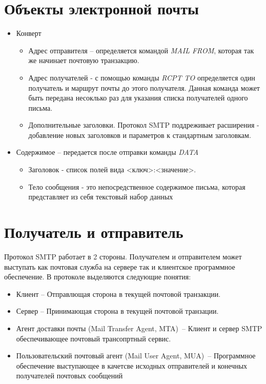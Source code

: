 \documentclass[a4paper,12pt]{report}
\begin{document}
	 \section{Объекты электронной почты} 
	 \begin{itemize}
	 	\item Конверт
	 	   \begin{itemize}
	 	       \item Адрес отправителя -- определяется командой \textit{MAIL FROM}, которая так же начинает почтовую транзакцию. 
	 	       \item Адрес получателей - с помощью команды \textit{RCPT TO} определяется один получатель и маршрут почты до этого получателя. Данная команда может быть передана несоклько раз для указания списка получателей одного письма.
	 	       \item Дополнительные заголовки. Протокол SMTP поддреживает расширения - добавление новых заголовков и параметров к стандартным заголовкам.
	 	   \end{itemize}
	 	  \item Содержимое -- передается после отправки команды \textit{DATA}
	 	  \begin{itemize}
	 	      \item Заголовок - список полей вида <ключ>:<значение>.
	 	      \item Тело сообщения - это непосредственное содержимое письма, которая представляет из себя текстовый набор данных
		   \end{itemize}
	 \end{itemize}
	 
	 \section{Получатель и отправитель}
	 
	 Протокол SMTP работает в 2 стороны. Получателем и отправителем может выступать как почтовая служба на сервере так и клиентское программное обеспечение. В протоколе выделяются следующие понятия:
	 \begin{itemize}
	     \item Клиент -- Отправлющая сторона в текущей почтовой транзакции.
	     \item Сервер -- Принимающая сторона в текущей почтовой транзации.
	     \item Агент доставки почты (Mail Transfer Agent, MTA)~-- Клиент и сервер SMTP обеспечивающее почтовый трансопртный сервис.
	     \item Пользовательский почтовый агент (Mail User Agent, MUA)~-- Программное обеспечение выступающее в качетсве исходных отправителей и конечных получателей почтовых сообщений
	 \end{itemize}
\end{document}
